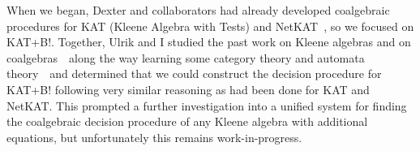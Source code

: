 \documentclass[12pt]{article}
\begin{document}
When we began, Dexter and collaborators had already developed coalgebraic procedures for KAT (Kleene Algebra with Tests) and NetKAT~\cite{foster2014coalgebraic}, so we focused on KAT+B!.
Together, Ulrik and I studied the past work on Kleene algebras and on coalgebras~\textemdash~along the way learning some category theory and automata theory~\textemdash~and determined that we could construct the decision procedure for KAT+B! following very similar reasoning as had been done for KAT and NetKAT.
This prompted a further investigation into a unified system for finding the coalgebraic decision procedure of any Kleene algebra with additional equations, but unfortunately this remains work-in-progress.


\vfill
\renewcommand{\section}[2]{}
\begin{multicols}{2}
\footnotesize


\end{multicols}
\end{document}
